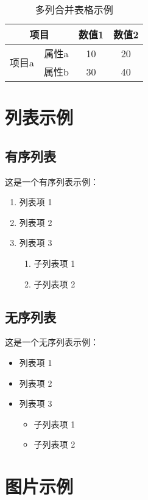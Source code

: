 \documentclass{ranarticle}
\begin{document}
\begin{table}[htbp]
    \centering
    \caption{多列合并表格示例}
    \begin{tabular}{|c|c|c|c|}
        \hline
        \multicolumn{2}{|c|}{项目} & 数值1 & 数值2      \\
        \hline
        \multirow{2}{*}{项目a}     & 属性a & 10    & 20 \\
        \cline{2-4}
                                   & 属性b & 30    & 40 \\
        \hline
    \end{tabular}
\end{table}

\section{列表示例}
\subsection{有序列表}
这是一个有序列表示例：
\begin{enumerate}
    \item 列表项 1
    \item 列表项 2
    \item 列表项 3
          \begin{enumerate}
              \item 子列表项 1
              \item 子列表项 2
          \end{enumerate}
\end{enumerate}

\subsection{无序列表}

这是一个无序列表示例：

\begin{itemize}
    \item 列表项 1
    \item 列表项 2
    \item 列表项 3
          \begin{itemize}
              \item 子列表项 1
              \item 子列表项 2
          \end{itemize}
\end{itemize}

\section{图片示例}
\end{document}
